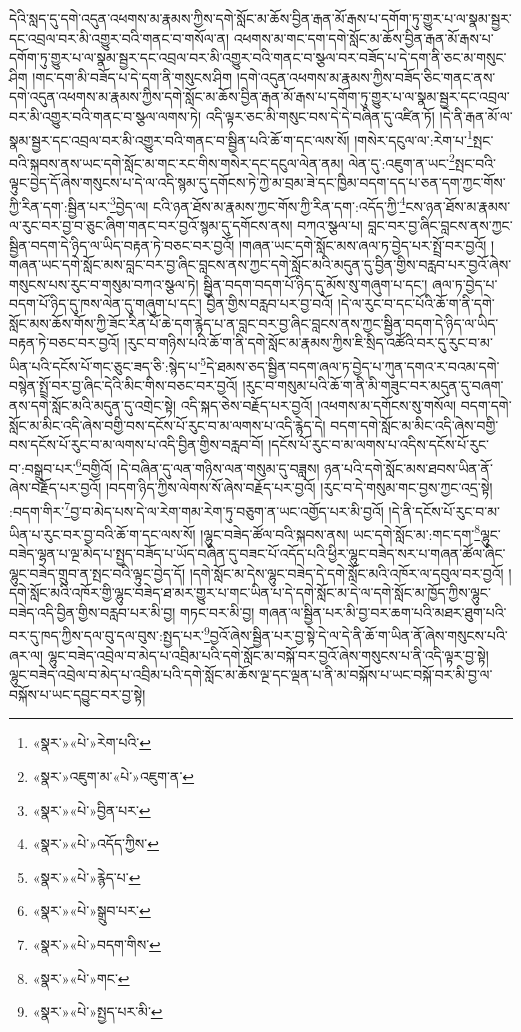 དེའི་སླད་དུ་དགེ་འདུན་འཕགས་མ་རྣམས་ཀྱིས་དགེ་སློང་མ་ཆོས་བྱིན་རྒན་མོ་རྒས་པ་དགོག་ཏུ་གྱུར་པ་ལ་སྣམ་སྦྱར་དང་འབྲལ་བར་མི་འགྱུར་བའི་གནང་བ་གསོལ་ན། འཕགས་མ་གང་དག་དགེ་སློང་མ་ཆོས་བྱིན་རྒན་མོ་རྒས་པ་དགོག་ཏུ་གྱུར་པ་ལ་སྣམ་སྦྱར་དང་འབྲལ་བར་མི་འགྱུར་བའི་གནང་བ་སྩལ་བར་བཟོད་པ་དེ་དག་ནི་ཅང་མ་གསུང་ཤིག །གང་དག་མི་བཟོད་པ་དེ་དག་ནི་གསུངས་ཤིག །དགེ་འདུན་འཕགས་མ་རྣམས་ཀྱིས་བཟོད་ཅིང་གནང་ནས་དགེ་འདུན་འཕགས་མ་རྣམས་ཀྱིས་དགེ་སློང་མ་ཆོས་བྱིན་རྒན་མོ་རྒས་པ་དགོག་ཏུ་གྱུར་པ་ལ་སྣམ་སྦྱར་དང་འབྲལ་བར་མི་འགྱུར་བའི་གནང་བ་སྩལ་ལགས་ཏེ། འདི་ལྟར་ཅང་མི་གསུང་བས་དེ་དེ་བཞིན་དུ་འཛིན་ཏོ། །དེ་ནི་རྒན་མོ་ལ་སྣམ་སྦྱར་དང་འབྲལ་བར་མི་འགྱུར་བའི་གནང་བ་སྦྱིན་པའི་ཆོ་ག་དང་ལས་སོ། །གསེར་དངུལ་ལ་:རེག་པ་\footnote{«སྣར་»«པེ་»རེག་པའི་}སྤང་བའི་སྐབས་ནས་ཡང་དགེ་སློང་མ་གང་རང་གིས་གསེར་དང་དངུལ་ལེན་ནམ། ལེན་དུ་:འཇུག་ན་ཡང་\footnote{«སྣར་»འཇུག་མ་«པེ་»འཇུག་ན་}སྤང་བའི་ལྟུང་བྱེད་དོ་ཞེས་གསུངས་པ་དེ་ལ་འདི་སྙམ་དུ་དགོངས་ཏེ་ཀྱེ་མ་བྲམ་ཟེ་དང་ཁྱིམ་བདག་དད་པ་ཅན་དག་ཀྱང་གོས་ཀྱི་རིན་དག་:སྦྱིན་པར་\footnote{«སྣར་»«པེ་»བྱིན་པར་}བྱེད་ལ། ངའི་ཉན་ཐོས་མ་རྣམས་ཀྱང་གོས་ཀྱི་རིན་དག་:འདོད་ཀྱི་\footnote{«སྣར་»«པེ་»འདོད་ཀྱིས་}ངས་ཉན་ཐོས་མ་རྣམས་ལ་རུང་བར་བྱ་བ་ཅུང་ཞིག་གནང་བར་བྱའོ་སྙམ་དུ་དགོངས་ནས། བཀའ་སྩལ་པ། བླང་བར་བྱ་ཞིང་བླངས་ནས་ཀྱང་སྦྱིན་བདག་དེ་ཉིད་ལ་ཡིད་བརྟན་ཏེ་བཅང་བར་བྱའོ། །གཞན་ཡང་དགེ་སློང་མས་ཞལ་ཏ་བྱེད་པར་སྤྲོ་བར་བྱའོ། །གཞན་ཡང་དགེ་སློང་མས་བླང་བར་བྱ་ཞིང་བླངས་ནས་ཀྱང་དགེ་སློང་མའི་མདུན་དུ་བྱིན་གྱིས་བརླབ་པར་བྱའོ་ཞེས་གསུངས་པས་རུང་བ་གསུམ་བཀའ་སྩལ་ཏེ། སྦྱིན་བདག་བདག་པོ་ཉིད་དུ་མོས་སུ་གཞུག་པ་དང་། ཞལ་ཏ་བྱེད་པ་བདག་པོ་ཉིད་དུ་ཁས་ལེན་དུ་གཞུག་པ་དང་། བྱིན་གྱིས་བརླབ་པར་བྱ་བའོ། །དེ་ལ་རུང་བ་དང་པོའི་ཆོ་ག་ནི་དགེ་སློང་མས་ཆོས་གོས་ཀྱི་ཟོང་རིན་པོ་ཆེ་དག་རྙེད་པ་ན་བླང་བར་བྱ་ཞིང་བླངས་ནས་ཀྱང་སྦྱིན་བདག་དེ་ཉིད་ལ་ཡིད་བརྟན་ཏེ་བཅང་བར་བྱའོ། །རུང་བ་གཉིས་པའི་ཆོ་ག་ནི་དགེ་སློང་མ་རྣམས་ཀྱིས་ཇི་སྲིད་འཚོའི་བར་དུ་རུང་བ་མ་ཡིན་པའི་དངོས་པོ་གང་ཅུང་ཟད་ཅི་:སྙེད་པ་\footnote{«སྣར་»«པེ་»རྙེད་པ་}དེ་ཐམས་ཅད་སྦྱིན་བདག་ཞལ་ཏ་བྱེད་པ་ཀུན་དགའ་ར་བའམ་དགེ་བསྙེན་སྤྲོ་བར་བྱ་ཞིང་དེའི་མིང་གིས་བཅང་བར་བྱའོ། །རུང་བ་གསུམ་པའི་ཆོ་ག་ནི་མི་གཟུང་བར་མདུན་དུ་བཞག་ནས་དགེ་སློང་མའི་མདུན་དུ་འགྲེང་སྟེ། འདི་སྐད་ཅེས་བརྗོད་པར་བྱའོ། །འཕགས་མ་དགོངས་སུ་གསོལ། བདག་དགེ་སློང་མ་མིང་འདི་ཞེས་བགྱི་བས་དངོས་པོ་རུང་བ་མ་ལགས་པ་འདི་རྙེད་དེ། བདག་དགེ་སློང་མ་མིང་འདི་ཞེས་བགྱི་བས་དངོས་པོ་རུང་བ་མ་ལགས་པ་འདི་བྱིན་གྱིས་བརླབ་བོ། །དངོས་པོ་རུང་བ་མ་ལགས་པ་འདིས་དངོས་པོ་རུང་བ་:བསྒྲུབ་པར་\footnote{«སྣར་»«པེ་»སྒྲུབ་པར་}བགྱིའོ། །དེ་བཞིན་དུ་ལན་གཉིས་ལན་གསུམ་དུ་བཟླས། ཉན་པའི་དགེ་སློང་མས་ཐབས་ཡིན་ནོ་ཞེས་བརྗོད་པར་བྱའོ། །བདག་ཉིད་ཀྱིས་ལེགས་སོ་ཞེས་བརྗོད་པར་བྱའོ། །རུང་བ་དེ་གསུམ་གང་བྱས་ཀྱང་འདྲ་སྟེ། :བདག་གིར་\footnote{«སྣར་»«པེ་»བདག་གིས་}བྱ་བ་མེད་པས་དེ་ལ་རེག་གམ་རེག་ཏུ་བཅུག་ན་ཡང་འགྱོད་པར་མི་བྱའོ། །དེ་ནི་དངོས་པོ་རུང་བ་མ་ཡིན་པ་རུང་བར་བྱ་བའི་ཆོ་ག་དང་ལས་སོ། །ལྷུང་བཟེད་ཚོལ་བའི་སྐབས་ནས། ཡང་དགེ་སློང་མ་:གང་དག་\footnote{«སྣར་»«པེ་»གང་}ལྷུང་བཟེད་ལྷན་པ་ལྔ་མེད་པ་སྤྱད་བཟོད་པ་ཡོད་བཞིན་དུ་བཟང་པོ་འདོད་པའི་ཕྱིར་ལྷུང་བཟེད་སར་པ་གཞན་ཚོལ་ཞིང་ལྷུང་བཟེད་གྲུབ་ན་སྤང་བའི་ལྟུང་བྱེད་དོ། །དགེ་སློང་མ་དེས་ལྷུང་བཟེད་དེ་དགེ་སློང་མའི་འཁོར་ལ་དབུལ་བར་བྱའོ། །དགེ་སློང་མའི་འཁོར་གྱི་ལྷུང་བཟེད་ཐ་མར་གྱུར་པ་གང་ཡིན་པ་དེ་དགེ་སློང་མ་དེ་ལ་དགེ་སློང་མ་ཁྱོད་ཀྱིས་ལྷུང་བཟེད་འདི་བྱིན་གྱིས་བརླབ་པར་མི་བྱ། གཏང་བར་མི་བྱ། གཞན་ལ་སྦྱིན་པར་མི་བྱ་བར་ཆག་པའི་མཐར་ཐུག་པའི་བར་དུ་ཁད་ཀྱིས་དལ་བུ་དལ་བུས་:སྤྱད་པར་\footnote{«སྣར་»«པེ་»སྤྱད་པར་མི་}བྱའོ་ཞེས་སྦྱིན་པར་བྱ་སྟེ་དེ་ལ་དེ་ནི་ཆོ་ག་ཡིན་ནོ་ཞེས་གསུངས་པའི་ཞར་ལ། ལྷུང་བཟེད་འབྲེལ་བ་མེད་པ་འབྲིམ་པའི་དགེ་སློང་མ་བསྐོ་བར་བྱའོ་ཞེས་གསུངས་པ་ནི་འདི་ལྟར་བྱ་སྟེ། ལྷུང་བཟེད་འབྲེལ་བ་མེད་པ་འབྲིམ་པའི་དགེ་སློང་མ་ཆོས་ལྔ་དང་ལྡན་པ་ནི་མ་བསྐོས་པ་ཡང་བསྐོ་བར་མི་བྱ་ལ་བསྐོས་པ་ཡང་དབྱུང་བར་བྱ་སྟེ། 